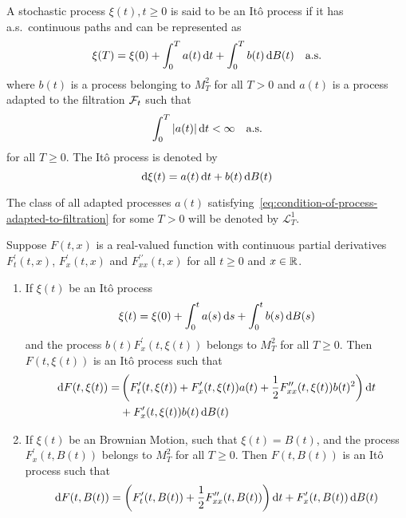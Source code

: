 \begin{definition}
	A stochastic process $\xi(t),t\geq 0$ is said to be an Itô process if it has a.s.\ continuous paths and can be represented as
	\begin{equation}
		\xi(T)=\xi(0)+\int_{0}^{T}a(t)\mathop{}\!\mathrm{d} t+\int_{0}^{T}b(t)\mathop{}\!\mathrm{d} B(t)\quad\text{a.s.}
	\end{equation}
	where $b(t)$ is a process belonging to $M_{T}^{2}$ for all $T>0$ and $a(t)$ is a process adapted to the filtration ${\mathcal F}_{t}$ such that
	\begin{equation}
		\int_{0}^{T}|a(t)|\mathop{}\!\mathrm{d} t<\infty\quad\text {a.s.} \label{eq:condition-of-process-adapted-to-filtration}
	\end{equation}
	for all $T\geq 0$.
	The Itô process is denoted by
	\begin{equation}
		\mathop{}\!\mathrm{d}\xi(t)=a(t)\mathop{}\!\mathrm{d} t+b(t)\mathop{}\!\mathrm{d} B(t)
	\end{equation}
\end{definition}

\begin{remark}
	The class of all adapted processes $a(t)$ satisfying~\ref{eq:condition-of-process-adapted-to-filtration} for some $T>0$ will be denoted by $\mathcal{L}_{T}^{1}$.
\end{remark}

\begin{theorem}[It\^o Formula]
	Suppose $F\left(t,x\right)$ is a real-valued function with continuous partial derivatives $F_{t}^{\prime}\left(t,x\right)$, $F_{x}^{\prime}\left(t,x\right)$ and $F_{xx}^{\prime\prime}\left(t,x\right)$ for all $t\geq 0$ and $x\in{\mathbb R}$.
	\begin{enumerate}
		\item If $\xi(t)$ be an It\^o process
		      \begin{equation*}
			      \xi(t)=\xi(0)+\int_{0}^{t}a(s)\mathop{}\!\mathrm{d} s+\int_{0}^{t}b(s)\mathop{}\!\mathrm{d} B(s)
		      \end{equation*}
		      and the process $b(t)F_{x}^{\prime}(t,\xi(t))$ belongs to $M_{T}^{2}$ for all $T\geq 0$. Then $F(t,\xi(t))$ is an It\^o process such that
		      \begin{equation}
			      \begin{aligned}
				      \mathop{}\!\mathrm{d} F(t,\xi(t))= & \left(F_{t}^{\prime}(t,\xi(t))+F_{x}^{\prime}(t,\xi(t))a(t)+\frac{1}{2}F_{xx}^{\prime\prime}(t,\xi(t))b(t)^{2}\right)\mathop{}\!\mathrm{d} t \\
				                        & +F_{x}^{\prime}(t,\xi(t))b(t)\mathop{}\!\mathrm{d} B(t)
			      \end{aligned}
		      \end{equation}
		\item If $\xi(t)$ be an Brownian Motion, such that $\xi(t)=B(t)$, and the process $F_{x}^{\prime}(t,B(t))$ belongs to $M_{T}^{2}$ for all $T \geq 0$. Then $F(t,B(t))$ is an It\^o process such that
		      \begin{equation}
			      \mathop{}\!\mathrm{d} F(t,B(t))=\left(F_{t}^{\prime}(t,B(t))+\frac{1}{2}F_{xx}^{\prime\prime}(t,B(t))\right)\mathop{}\!\mathrm{d} t+F_{x}^{\prime}(t,B(t))\mathop{}\!\mathrm{d} B(t)
		      \end{equation}
	\end{enumerate}
\end{theorem}


